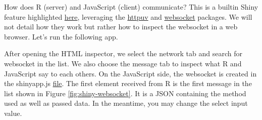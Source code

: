 \documentclass[]{book}
\newenvironment{Shaded}{\begin{snugshade}}{\end{snugshade}}
\newcommand{\AttributeTok}[1]{\textcolor[rgb]{0.77,0.63,0.00}{#1}}
\newcommand{\ControlFlowTok}[1]{\textcolor[rgb]{0.13,0.29,0.53}{\textbf{#1}}}
\newcommand{\DataTypeTok}[1]{\textcolor[rgb]{0.13,0.29,0.53}{#1}}
\newcommand{\KeywordTok}[1]{\textcolor[rgb]{0.13,0.29,0.53}{\textbf{#1}}}
\newcommand{\NormalTok}[1]{#1}
\newcommand{\OperatorTok}[1]{\textcolor[rgb]{0.81,0.36,0.00}{\textbf{#1}}}
\newcommand{\OtherTok}[1]{\textcolor[rgb]{0.56,0.35,0.01}{#1}}
\newcommand{\StringTok}[1]{\textcolor[rgb]{0.31,0.60,0.02}{#1}}
\newcommand{\VariableTok}[1]{\textcolor[rgb]{0.00,0.00,0.00}{#1}}
\begin{document}
How does R (server) and JavaScript (client) communicate? This is a builtin Shiny feature highlighted \href{Fast\%20bidirectional\%20communication\%20between\%20the\%20web\%20browser\%20and\%20R\%20using\%20the\%20httpuv\%20package.}{here}, leveraging the \href{https://github.com/rstudio/httpuv}{httpuv} and \href{https://github.com/rstudio/websocket}{websocket} packages. We will not detail how they work but rather how to inspect the websocket in a web browser. Let's run the following app.

\begin{Shaded}
\end{Shaded}

After opening the HTML inspector, we select the network tab and search for websocket in the list. We also choose the message tab to inspect what R and JavaScript say to each others. On the JavaScript side, the websocket is created in the shinyapp.js \href{https://github.com/rstudio/shiny/blob/master/srcjs/shinyapp.js}{file}. The first element received from R is the first message in the list shown in Figure \ref{fig:shiny-websocket}. It is a JSON containing the method used as well as passed data. In the meantime, you may change the select input value.

\begin{Shaded}
\end{Shaded}
\end{document}

